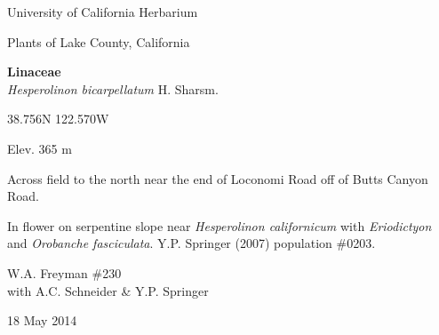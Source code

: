 \documentclass[letterpaper,10pt]{article}
\begin{document}
\begin{minipage}[t]{0.40\textwidth}

\begin{center}
University of California Herbarium \\
\begin{large}
Plants of Lake County, California \\
\end{large}
\vspace{\baselineskip}
\textbf{Linaceae} \\
\textit{Hesperolinon bicarpellatum} H. Sharsm.\\
\end{center}

\begin{footnotesize}

\begin{multicols}{2}
38.756\textdegree N 122.570\textdegree W
\columnbreak
\begin{flushright}
Elev. 365 m
\end{flushright}
\end{multicols}

Across field to the north near the end of Loconomi Road off of Butts Canyon Road.
\vspace{\baselineskip}

In flower on serpentine slope near \textit{Hesperolinon californicum} with \textit{Eriodictyon} and \textit{Orobanche fasciculata}. Y.P. Springer (2007) population \#0203.

\begin{multicols}{2}
W.A. Freyman \#230 \\
with A.C. Schneider \& Y.P. Springer
\columnbreak
\begin{flushright}
18 May 2014
\end{flushright}
\end{multicols}

\end{footnotesize}

\end{minipage}
%
\hspace{2cm}
%
\end{document}
